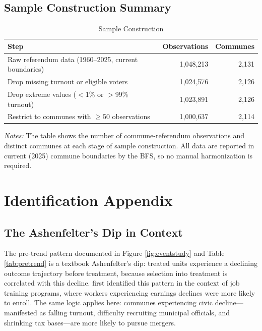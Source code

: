 \documentclass[12pt]{article}
\begin{document}
\subsection{Sample Construction Summary}

\begin{table}[H]
    \centering
    \caption{Sample Construction}
    \begin{threeparttable}
    \begin{tabular}{lrr}
        \toprule
        Step & Observations & Communes \\
        \midrule
        Raw referendum data (1960--2025, current boundaries) & 1,048,213 & 2,131 \\
        Drop missing turnout or eligible voters & 1,024,576 & 2,126 \\
        Drop extreme values ($<$1\% or $>$99\% turnout) & 1,023,891 & 2,126 \\
        Restrict to communes with $\geq$50 observations & 1,000,637 & 2,114 \\
        \bottomrule
    \end{tabular}
    \begin{tablenotes}[flushleft]
    \small
    \item \textit{Notes:} The table shows the number of commune-referendum observations and distinct communes at each stage of sample construction. All data are reported in current (2025) commune boundaries by the BFS, so no manual harmonization is required.
    \end{tablenotes}
    \end{threeparttable}
    \label{tab:sample}
\end{table}


\section{Identification Appendix}
\label{sec:appendix_id}

\subsection{The Ashenfelter's Dip in Context}

The pre-trend pattern documented in Figure \ref{fig:eventstudy} and Table \ref{tab:pretrend} is a textbook Ashenfelter's dip: treated units experience a declining outcome trajectory before treatment, because selection into treatment is correlated with this decline. \citet{ashenfelter1978estimating} first identified this pattern in the context of job training programs, where workers experiencing earnings declines were more likely to enroll. The same logic applies here: communes experiencing civic decline---manifested as falling turnout, difficulty recruiting municipal officials, and shrinking tax bases---are more likely to pursue mergers.
\end{document}
